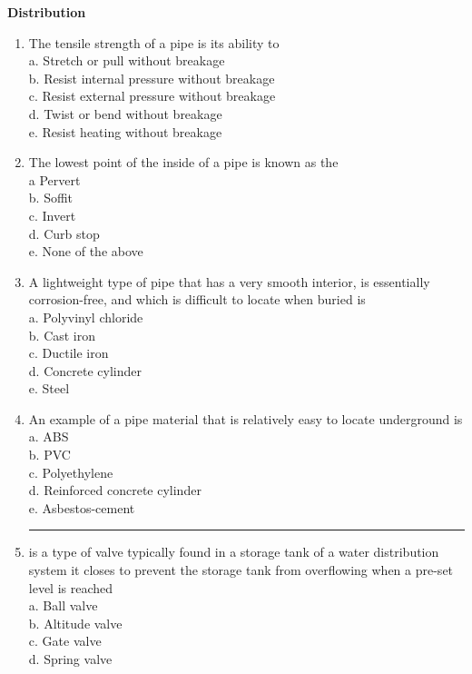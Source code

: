 \documentclass{article}
\begin{document}
\textbf{Distribution}
\begin{enumerate}[1.]
\item The tensile strength of a pipe is its ability to\\ 
a.	Stretch or pull without breakage\\
b.	Resist internal pressure without breakage\\
c.	Resist external pressure without breakage\\
d.	Twist or bend without breakage\\
e.	Resist heating without breakage

\item The lowest point of the inside of a pipe is known as the\\
a	Pervert\\
b.	Soffit\\
c.	Invert\\
d.	Curb stop\\
e.	None of the above

\item A lightweight type of pipe that has a very smooth interior, is essentially corrosion-free, and which is difficult to locate when buried is\\
a.	Polyvinyl chloride\\
b.	Cast iron\\
c.	Ductile iron\\
d.	Concrete cylinder\\
e.	Steel

\item An example of a pipe material that is relatively easy to locate underground is\\
a.	ABS\\
b.	PVC\\
c.	Polyethylene\\
d.	Reinforced concrete cylinder\\
e.	Asbestos-cement

\item \rule{9mm}{.1pt} is a type of valve typically found in a storage tank of a water distribution system it closes to prevent the storage tank from overflowing when a pre-set level is reached\\

a.	Ball valve\\
b.	Altitude valve\\
c.	Gate valve\\
d.	Spring valve\\


\end{enumerate}
\end{document}

